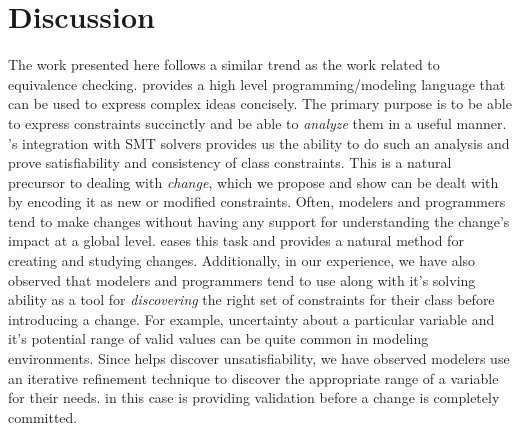 \section{Discussion}
\label{sec:discussion}

The work presented here follows a similar trend as the work related to
equivalence checking. \Klang{} provides a high level
programming/modeling language that can be used to express complex
ideas concisely. The primary purpose is to be able to express
constraints succinctly and be able to \emph{analyze} them in a useful
manner. \Klang's integration with SMT solvers provides us the ability
to do such an analysis and prove satisfiability and consistency of
class constraints. This is a natural precursor to dealing with
\emph{change}, which we propose and show can be dealt with by encoding
it as new or modified constraints. Often, modelers and programmers
tend to make changes without having any support for understanding the
change's impact at a global level. \Klang{} eases this task and
provides a natural method for creating and studying
changes. Additionally, in our experience, we have also observed that
modelers and programmers tend to use \Klang{} along with it's solving
ability as a tool for \emph{discovering} the right set of constraints
for their class before introducing a change. For example, uncertainty
about a particular variable and it's potential range of valid values
can be quite common in modeling environments. Since \Klang{} helps
discover unsatisfiability, we have observed modelers use an iterative
refinement technique to discover the appropriate range of a variable
for their needs. \Klang{} in this case is providing validation before
a change is completely committed.

